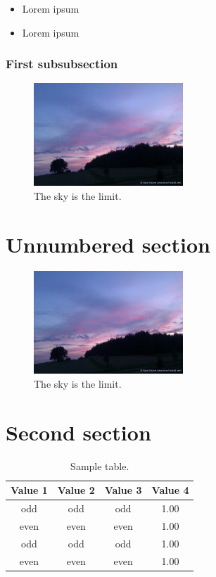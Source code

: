 \lipsum[1-2]

\rightboxbegin
\begin{itemize}
 \item Lorem ipsum
 \item Lorem ipsum
\end{itemize}
\rightboxend

\lipsum[1]

\subsubsection{First subsubsection}

\lipsum[1]

\begin{figure}[!h]
\centering
\includegraphics[width=0.5\textwidth]{sky.jpg}
\caption{The sky is the limit.}
\end{figure}

\section*{Unnumbered section}
\lipsum[1]

\begin{figure}[!h]
\centering
\includegraphics[width=0.5\textwidth]{sky.jpg}
\caption*{The sky is the limit.}
\end{figure}

\section{Second section}

\lipsum[1]
\begin{table}[!h]
\centering
\caption{Sample table.}
\begin{tabular}{cccc}
\toprule
Value 1 & Value 2 & Value 3 & Value 4\\
\midrule
 odd     & odd   & odd & 1.00 \\
 even    & even  & even& 1.00 \\
 odd     & odd   & odd & 1.00 \\
 even    & even  & even& 1.00 \\
\bottomrule
\end{tabular}
\end{table}


